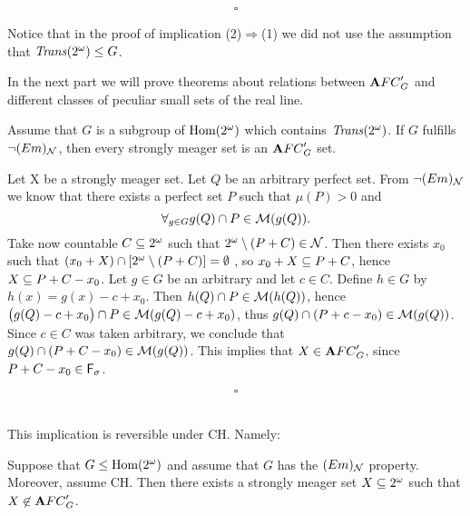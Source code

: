   \[ \square \]

Notice that in the proof of implication (2)$\Rightarrow$(1)
we did not use the assumption that
${\it Trans}(2^{\omega}) \leq G$.

\bigskip

  In the next part we will prove theorems about relations between
${\mathbf AFC}^\prime_{G}$ and different classes of peculiar small sets of the real line.

\begin{theorem}
\label{-em=>N}
  Assume that $G$ is a subgroup
of ${\rm Hom(2^{\omega})}$ which contains ${\it Trans}(2^{\omega})$.
  If $G$ fulfills $\neg (Em)_{{\cal N}}$,
then every strongly meager set is an ${\mathbf AFC}^\prime_{G}$ set.
\end{theorem}

\proof

Let X be a strongly meager set.
Let $Q$ be an arbitrary perfect set.
From $\neg (Em)_{{\cal N}}$ we know that there exists a perfect
set $P$ such that $\mu (P) > 0$ and
  \[ \forall_{g \in G} g(Q) \cap P \in {\cal M}(g(Q)). \]
Take now countable $C \subseteq 2^{\omega} $ such that
$2^{\omega} \setminus (P + C) \in {\cal N}$.
  Then there exists $x_0$ such that $(x_0 +X) \cap
[ 2^{\omega} \setminus (P + C) ] = \emptyset $ ,
so $x_0 + X \subseteq P + C$, hence $X \subseteq P + C - x_0$.
  Let $g \in G$ be an arbitrary and let $c \in C$.
Define $h \in G$ by $h(x) = g(x) - c + x_0$.
  Then $h(Q) \cap P \in {\cal M}(h(Q))$, hence
$\big( g(Q) - c + x_0\big) \cap P \in {\cal M}(g(Q) - c + x_0)$,
thus $g(Q) \cap (P + c - x_0) \in {\cal M}(g(Q))$.
  Since $c \in C$ was taken arbitrary, we conclude that
$g(Q) \cap (P + C - x_0) \in {\cal M}(g(Q))$.
  This implies that $X \in {\mathbf AFC}^\prime_{G}$, since $P + C - x_0 \in {\sf F}_{\sigma}$.


$$\square$$

 \\

This implication is reversible
under CH. Namely:

\begin{theorem}
Suppose that $G \leq {\rm Hom(2^{\omega})}$ and assume that $G$ has the $(Em)_{{\cal N}}$
property. Moreover, assume CH. Then there exists a strongly
meager set $X\subseteq2^{\omega}$ such that $X \not\in {\mathbf AFC}^\prime_{G}$.
\end{theorem}


